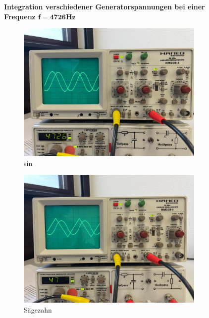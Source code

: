 \begin{figure}
  \centering
  \textbf{Integration verschiedener Generatorspannungen bei einer Frequenz $\symbf{f = 4726\unit{\hertz}}$}\par\medskip
  \begin{subfigure}{0.48\textwidth}
    \centering
    \includegraphics[scale=0.1]{content/sinInt.png}
    \caption{sin}
  \end{subfigure}
  \hfill
  \begin{subfigure}{0.48\textwidth}
    \centering
    \includegraphics[scale=0.1]{content/saegInt.png}
    \caption{Sägezahn}
  \end{subfigure}
  \caption{}
\end{figure}

